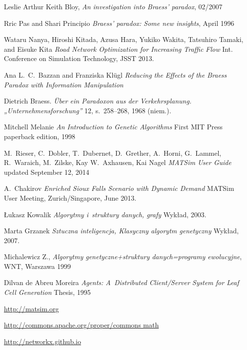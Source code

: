 \documentclass[twoside,12pt]{report}
\renewcommand{\bibname}{Bibliografia}
\begin{document}
\cleardoublepage
{}
\addcontentsline{toc}{chapter}{\bibname} 
\begin{thebibliography}{99}
	Leslie Arthur Keith Bloy, 
	\textit{An investigation into Braess’ paradox}, 02/2007

	Rric Pas and Shari Principio
	\textit{Braess’ paradox: Some new insights}, April 1996

	Wataru Nanya, Hiroshi Kitada, Azusa Hara, Yukiko Wakita, Tatsuhiro Tamaki, and Eisuke Kita
	\textit{Road Network Optimization for Increasing Traffic Flow}
	Int. Conference on Simulation Technology, JSST 2013.

	Ana L.~C.~Bazzan and Franziska Klügl
	\textit{Reducing the Effects of the Braess Paradox with Information Manipulation}

	Dietrich Braess. 
	\textit{Über ein Paradoxon aus der Verkehrsplanung. „Unternehmensforschung”} 
	12, s.~258–268, 1968 (niem.).

	Mitchell Melanie
	\textit{An Introduction to Genetic Algorithms}
	First MIT Press paperback edition, 1998

	M.~Rieser, C.~Dobler, T.~Dubernet, D.~Grether, A.~Horni, G.~Lammel, R.~Waraich, M.~Zilske, Kay W.~Axhausen, Kai Nagel
	\textit{MATSim User Guide}
	updated September 12, 2014

	A.~Chakirov
	\textit{Enriched Sioux Falls Scenario with Dynamic Demand}
	MATSim User Meeting, Zurich/Singapore, June 2013.
	
	Łukasz Kowalik
	\textit{Algorytmy i~struktury danych, grafy}
	Wykład, 2003.
	
	Marta Grzanek
	\textit{Sztuczna inteligencja, Klasyczny algorytm genetyczny}
	Wykład, 2007.
	
	Michalewicz Z.,
	\textit{Algorytmy genetyczne+struktury danych=programy ewolucyjne},
	WNT, Warszawa 1999
	
	Dilvan de Abreu Moreira
	\textit{Agents: A~Distributed Client/Server System for Leaf Cell Generation}
	Thesis, 1995
	
	\url{http://matsim.org}	

	\url{http://commons.apache.org/proper/commons math}
	
	\url{http://networkx.github.io}


\end{thebibliography}
\end{document}
